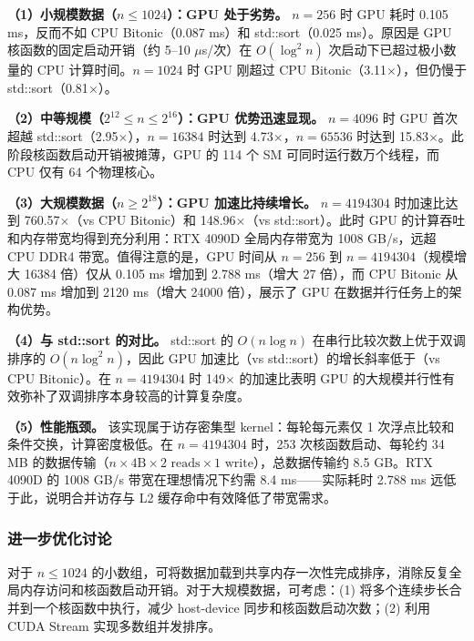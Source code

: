 \documentclass[UTF8,a4paper,10pt]{ctexart}
\begin{document}
\textbf{（1）小规模数据（$n \leq 1024$）：GPU 处于劣势。} $n=256$ 时 GPU 耗时 0.105 ms，反而不如 CPU Bitonic（0.087 ms）和 std::sort（0.025 ms）。原因是 GPU 核函数的固定启动开销（约 5--10 $\mu$s/次）在 $O(\log^2 n)$ 次启动下已超过极小数量的 CPU 计算时间。$n=1024$ 时 GPU 刚超过 CPU Bitonic（3.11$\times$），但仍慢于 std::sort（0.81$\times$）。

\textbf{（2）中等规模（$2^{12} \leq n \leq 2^{16}$）：GPU 优势迅速显现。} $n=4096$ 时 GPU 首次超越 std::sort（2.95$\times$），$n=16384$ 时达到 4.73$\times$，$n=65536$ 时达到 15.83$\times$。此阶段核函数启动开销被摊薄，GPU 的 114 个 SM 可同时运行数万个线程，而 CPU 仅有 64 个物理核心。

\textbf{（3）大规模数据（$n \geq 2^{18}$）：GPU 加速比持续增长。} $n=4194304$ 时加速比达到 760.57$\times$（vs CPU Bitonic）和 148.96$\times$（vs std::sort）。此时 GPU 的计算吞吐和内存带宽均得到充分利用：RTX 4090D 全局内存带宽为 1008 GB/s，远超 CPU DDR4 带宽。值得注意的是，GPU 时间从 $n=256$ 到 $n=4194304$（规模增大 16384 倍）仅从 0.105 ms 增加到 2.788 ms（增大 27 倍），而 CPU Bitonic 从 0.087 ms 增加到 2120 ms（增大 24000 倍），展示了 GPU 在数据并行任务上的架构优势。

\textbf{（4）与 std::sort 的对比。} std::sort 的 $O(n \log n)$ 在串行比较次数上优于双调排序的 $O(n \log^2 n)$，因此 GPU 加速比（vs std::sort）的增长斜率低于（vs CPU Bitonic）。在 $n=4194304$ 时 149$\times$ 的加速比表明 GPU 的大规模并行性有效弥补了双调排序本身较高的计算复杂度。

\textbf{（5）性能瓶颈。} 该实现属于访存密集型 kernel：每轮每元素仅 1 次浮点比较和条件交换，计算密度极低。在 $n=4194304$ 时，253 次核函数启动、每轮约 34 MB 的数据传输（$n \times 4\text{B} \times 2\text{ reads} \times 1\text{ write}$），总数据传输约 8.5 GB。RTX 4090D 的 1008 GB/s 带宽在理想情况下约需 8.4 ms——实际耗时 2.788 ms 远低于此，说明合并访存与 L2 缓存命中有效降低了带宽需求。

\subsubsection{进一步优化讨论}

对于 $n \leq 1024$ 的小数组，可将数据加载到共享内存一次性完成排序，消除反复全局内存访问和核函数启动开销。对于大规模数据，可考虑：(1) 将多个连续步长合并到一个核函数中执行，减少 host-device 同步和核函数启动次数；(2) 利用 CUDA Stream 实现多数组并发排序。

\end{document}
